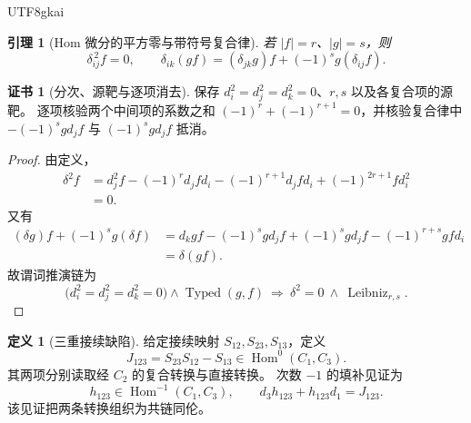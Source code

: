 \documentclass[12pt,a4paper,openany,notitlepage]{report}
\theoremstyle{plain}
\newtheorem{lemma}[theorem]{引理}
\theoremstyle{definition}
\newtheorem{definition}[theorem]{定义}
\newtheorem*{certificate}{证书}
\theoremstyle{remark}
\begin{document}
\begin{CJK*}{UTF8}{gkai}
\begin{lemma}[Hom 微分的平方零与带符号复合律]
\label{hgov:lem-hom}
若 $|f|=r$、$|g|=s$，则
\[
 \delta_{ij}^{\,2}f=0,\qquad
 \delta_{ik}(gf)=(\delta_{jk}g)f+(-1)^s g(\delta_{ij}f).
\]
\end{lemma}
\begin{certificate}[分次、源靶与逐项消去]
保存 $d_i^2=d_j^2=d_k^2=0$、$r,s$ 以及各复合项的源靶。
逐项核验两个中间项的系数之和
$(-1)^r+(-1)^{r+1}=0$，并核验复合律中
$-(-1)^s gd_jf$ 与 $(-1)^s gd_jf$ 抵消。
\end{certificate}
\begin{proof}
由定义，
\[
 \begin{aligned}
 \delta^2f
 &=d_j^2f-(-1)^rd_jfd_i
   -(-1)^{r+1}d_jfd_i+(-1)^{2r+1}fd_i^2\\
 &=0.
 \end{aligned}
\]
又有
\[
 \begin{aligned}
 (\delta g)f+(-1)^sg(\delta f)
 &=d_kgf-(-1)^sgd_jf
   +(-1)^sgd_jf-(-1)^{r+s}gfd_i\\
 &=\delta(gf).
 \end{aligned}
\]
故谓词推演链为
\[
 \bigl(d_i^2=d_j^2=d_k^2=0\bigr)\wedge
 \operatorname{Typed}(g,f)
 \ \Longrightarrow\
 \delta^2=0\ \wedge\ \operatorname{Leibniz}_{r,s}.
\]
\end{proof}

\begin{definition}[三重接续缺陷]
\label{hgov:def-defect}
给定接续映射 $S_{12},S_{23},S_{13}$，定义
\[
 J_{123}=S_{23}S_{12}-S_{13}
 \in\operatorname{Hom}^0(C_1,C_3).
\]
其两项分别读取经 $C_2$ 的复合转换与直接转换。
次数 $-1$ 的填补见证为
\[
 h_{123}\in\operatorname{Hom}^{-1}(C_1,C_3),\qquad
 d_3h_{123}+h_{123}d_1=J_{123}.
\]
该见证把两条转换组织为共链同伦。
\end{definition}


\end{CJK*}
\end{document}
